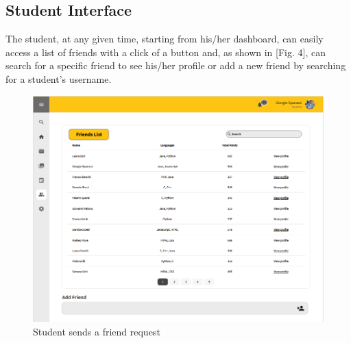 \documentclass[12pt,oneside,a4paper]{article}
\begin{document}
\subsection{Student Interface}
The student, at any given time, starting from his/her dashboard, can easily access a list of friends with a click of a button and, as shown in [Fig. 4], can search for a specific friend to see his/her profile or add a new friend by searching for a student's username.

\begin{figure}[htbp]
    \centering
    \includegraphics[width=1\linewidth]{Images/Interfaces/FriendsRequest.PNG}
    \caption{Student sends a friend request}
    \label{fig:enter-label}
\end{figure}

\pagebreak
\end{document}
